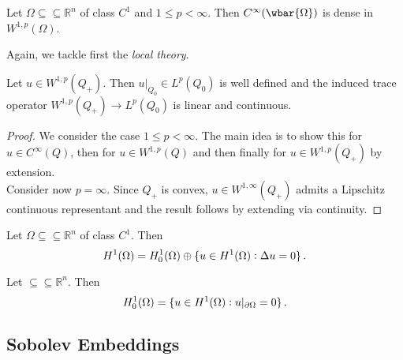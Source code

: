 \begin{corollary}
	Let $\Omega \subseteq \subseteq \mathbb{R}^n$ of class $C^1$ and $1 \leq p < \infty$. Then $C^\infty(\wbar{\Omega})$ is dense in $W^{1,p}(\Omega)$.
\end{corollary}

Again, we tackle first the \emph{local theory}.

\begin{lemma}
	Let $u \in W^{1,p}(Q_+)$. Then $u\vert_{Q_0} \in L^p(Q_0)$ is well defined and the induced trace operator $W^{1,p}(Q_+) \to L^p(Q_0)$ is linear and continuous.
\end{lemma}

\begin{proof}
	We consider the case \underline{$1 \leq p < \infty$}. The main idea is to show this for $u \in C^\infty(Q)$, then for $u \in W^{1,p}(Q)$ and then finally for $u \in W^{1,p}(Q_+)$ by extension.\\
	Consider now \underline{$p = \infty$}. Since $Q_+$ is convex, $u \in W^{1,\infty}(Q_+)$ admits a Lipschitz continuous representant and the result follows by extending via continuity.
\end{proof}

\begin{theorem}
	Let $\Omega \subseteq \subseteq \mathbb{R}^n$ of class $C^1$. Then
	\begin{equation*}
		H^1(\Omega) = H^1_0(\Omega) \oplus \cbr[0]{u \in H^1(\Omega) : \Delta u = 0}.
	\end{equation*}
\end{theorem}

\begin{corollary}
	Let $\subseteq \subseteq \mathbb{R}^n$. Then
	\begin{equation*}
		H^1_0(\Omega) = \cbr[0]{u \in H^1(\Omega) : u\vert_{\partial \Omega} = 0}.
	\end{equation*}
\end{corollary}

\subsection*{Sobolev Embeddings}

